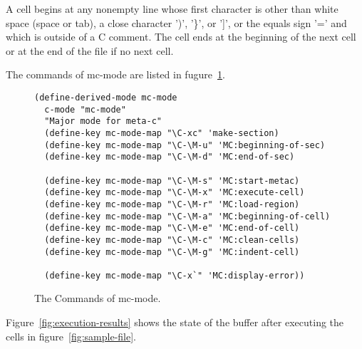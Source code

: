 \documentclass{article}
\begin{document}
A cell begins at any nonempty line whose first character is other than white space (space or tab), a close character ')', '\}', or ']', or the equals sign '=' and which is outside of a C comment.
The cell ends at the beginning of the next cell or at the end of the file if no next cell.

The commands of mc-mode are listed in fugure~\ref{fig:mc-commands}.

\begin{figure}
  
\begin{verbatim}
(define-derived-mode mc-mode
  c-mode "mc-mode"
  "Major mode for meta-c"
  (define-key mc-mode-map "\C-xc" 'make-section)
  (define-key mc-mode-map "\C-\M-u" 'MC:beginning-of-sec)
  (define-key mc-mode-map "\C-\M-d" 'MC:end-of-sec)
  
  (define-key mc-mode-map "\C-\M-s" 'MC:start-metac)
  (define-key mc-mode-map "\C-\M-x" 'MC:execute-cell)
  (define-key mc-mode-map "\C-\M-r" 'MC:load-region)
  (define-key mc-mode-map "\C-\M-a" 'MC:beginning-of-cell)
  (define-key mc-mode-map "\C-\M-e" 'MC:end-of-cell)
  (define-key mc-mode-map "\C-\M-c" 'MC:clean-cells)
  (define-key mc-mode-map "\C-\M-g" 'MC:indent-cell)

  (define-key mc-mode-map "\C-x`" 'MC:display-error))
\end{verbatim}

\caption{The Commands of mc-mode.}
\label{fig:mc-commands}
\end{figure}

Figure~\ref{fig:execution-results} shows the state of the buffer after executing the cells in figure~\ref{fig:sample-file}.
\end{document}
